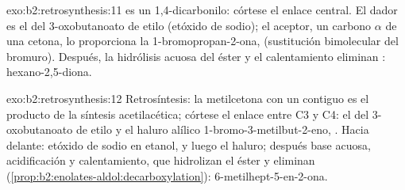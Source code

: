 \begin{solution}{exo:b2:retrosynthesis:11}
 es un 1,4-dicarbonilo: córtese el enlace  central. El dador es el  del
3-oxobutanoato de etilo (etóxido de sodio); el aceptor, un carbono $\alpha$ de una cetona, lo proporciona la
1-bromopropan-2-ona,  (sustitución bimolecular del bromuro). Después, la hidrólisis acuosa del
éster y el calentamiento eliminan : hexano-2,5-diona.
\end{solution}

\begin{solution}{exo:b2:retrosynthesis:12}
Retrosíntesis: la metilcetona con un  contiguo es el producto de la síntesis
acetilacética; córtese el enlace entre C3 y C4: el  del 3-oxobutanoato de etilo y el haluro alílico
1-bromo-3-metilbut-2-eno, . Hacia delante: etóxido de sodio en etanol, y luego el haluro;
después base acuosa, acidificación y calentamiento, que hidrolizan el éster y eliminan 
(\cref{prop:b2:enolates-aldol:decarboxylation}): 6-metilhept-5-en-2-ona.
\end{solution}


